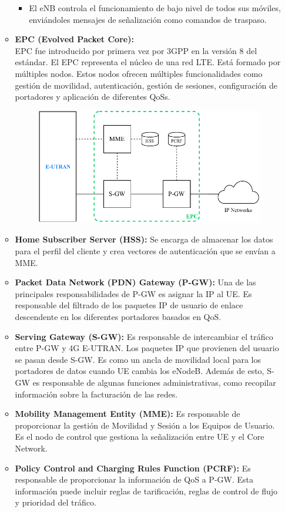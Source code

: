 \begin{itemize}
\begin{itemize}
\begin{itemize}
   \item El eNB controla el funcionamiento de bajo nivel de todos sus móviles, enviándoles mensajes de señalización como comandos de traspaso.\\
   \end{itemize}
	 \item \textbf{EPC (Evolved Packet Core):}\\
   EPC fue introducido por primera vez por 3GPP en la versión 8 del estándar. El EPC representa el núcleo de una red LTE. Está formado por múltiples nodos. Estos nodos ofrecen múltiples funcionalidades como gestión de movilidad, autenticación, gestión de sesiones, configuración de portadores y aplicación de diferentes QoSs.
	\begin{figure}[ht!]
	\centering
	\includegraphics[scale=0.8]{Imagenes/arq4GEPC.pdf}
	\end{figure}		
		
	\end{itemize}
	\begin{itemize}
	\item \textbf{Home Subscriber Server (HSS):} Se encarga de almacenar los datos para el perfil del cliente y crea vectores de autenticación que se envían a MME.
	\item \textbf{Packet Data Network (PDN) Gateway (P-GW):} Una de las principales responsabilidades de P-GW es asignar la IP al UE. Es responsable del filtrado de los paquetes IP de usuario de enlace descendente en los diferentes portadores basados en QoS.
	\item \textbf{Serving Gateway (S-GW):} Es responsable de intercambiar el tráfico entre P-GW y 4G E-UTRAN. Los paquetes IP que provienen del usuario se pasan desde S-GW. Es como un ancla de movilidad local para los portadores de datos cuando UE cambia los eNodeB. Además de esto, S-GW es responsable de algunas funciones administrativas, como recopilar información sobre la facturación de las redes.
	\item \textbf{Mobility Management Entity (MME):} Es responsable de proporcionar la gestión de Movilidad y Sesión a los Equipos de Usuario. Es el nodo de control que gestiona la señalización entre UE y el Core Network.
	\item \textbf{Policy Control and Charging Rules Function (PCRF):} Es responsable de proporcionar la información de QoS a P-GW. Esta información puede incluir reglas de tarificación, reglas de control de flujo y prioridad del tráfico.
	\end{itemize}


\end{itemize}
